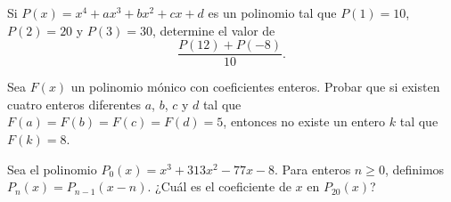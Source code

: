 \begin{section-problem}
    Si $P(x) = x^4 + ax^3 + bx^2 + cx + d$ es un polinomio tal que $P(1) = 10$, $P(2) = 20$ y $P(3) = 30$, determine el valor de
    \[\frac{P(12) + P(-8)}{10}.\]
\end{section-problem}

\begin{section-problem}
    Sea $F(x)$ un polinomio mónico con coeficientes enteros.
    Probar que si existen cuatro enteros diferentes $a$, $b$, $c$ y $d$ tal que $F(a) = F(b) = F(c)  = F(d) = 5$,
    entonces no existe un entero $k$ tal que $F(k) = 8$.
\end{section-problem}

\begin{section-problem}
    Sea el polinomio $P_0(x) = x^3 + 313x^2 - 77x - 8$.
    Para enteros $n \geq 0$, definimos $P_n(x) = P_{n - 1}(x - n)$.
    ¿Cuál es el coeficiente de $x$ en $P_{20}(x)$?
\end{section-problem}